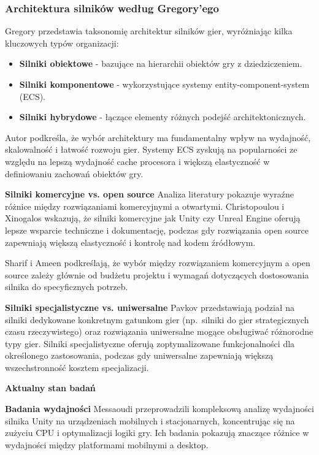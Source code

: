 \subsubsection{Architektura silników według Gregory'ego}
Gregory \cite{gregory2018game} przedstawia taksonomię architektur silników gier,
wyróżniając kilka kluczowych typów organizacji:

\begin{itemize}
    \item \textbf{Silniki obiektowe} - bazujące na hierarchii obiektów gry z dziedziczeniem.
    \item \textbf{Silniki komponentowe} - wykorzystujące systemy entity-component-system (ECS).
    \item \textbf{Silniki hybrydowe} - łączące elementy różnych podejść architektonicznych.
\end{itemize}

Autor podkreśla, że wybór architektury ma fundamentalny wpływ na wydajność, skalowalność i łatwość rozwoju gier. Systemy ECS zyskują na popularności ze względu na lepszą wydajność cache procesora i większą elastyczność w definiowaniu zachowań obiektów gry.

\textbf{Silniki komercyjne vs. open source}
Analiza literatury pokazuje wyraźne różnice między rozwiązaniami komercyjnymi a otwartymi. Christopoulou i Xinogalos \cite{christopoulou2017overview} wskazują, że silniki komercyjne jak Unity czy Unreal Engine oferują lepsze wsparcie techniczne i dokumentację, podczas gdy rozwiązania open source zapewniają większą elastyczność i kontrolę nad kodem źródłowym.

Sharif i Ameen \cite{sharif2021game} podkreślają, że wybór między rozwiązaniem komercyjnym a open source zależy głównie od budżetu projektu i wymagań dotyczących dostosowania silnika do specyficznych potrzeb.

\textbf{Silniki specjalistyczne vs. uniwersalne}
Pavkov \cite{pavkov2017comparison} przedstawiają podział na silniki
dedykowane konkretnym gatunkom gier (np.~silniki do gier strategicznych 
czasu rzeczywistego) oraz rozwiązania uniwersalne mogące obsługiwać
różnorodne typy gier. Silniki specjalistyczne oferują zoptymalizowane 
funkcjonalności dla określonego zastosowania, podczas gdy uniwersalne
zapewniają większą wszechstronność kosztem specjalizacji.

\textbf{Aktualny stan badań}

\textbf{Badania wydajności}
Messaoudi \cite{messaoudi2017performance} przeprowadzili kompleksową analizę wydajności silnika Unity na urządzeniach mobilnych i stacjonarnych, koncentrując się na zużyciu CPU i optymalizacji logiki gry. Ich badania pokazują znaczące różnice w wydajności między platformami mobilnymi a desktop.

